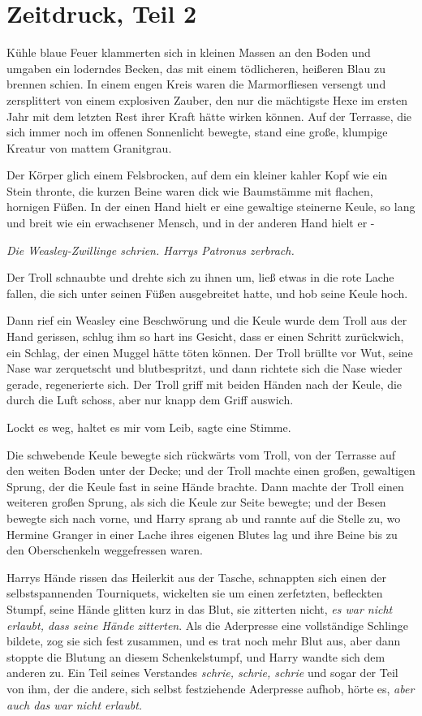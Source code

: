 \chapter{Zeitdruck, Teil 2}

Kühle blaue Feuer klammerten sich in kleinen Massen an den Boden und umgaben ein
loderndes Becken, das mit einem tödlicheren, heißeren Blau zu brennen schien. In
einem engen Kreis waren die Marmorfliesen versengt und zersplittert von einem
explosiven Zauber, den nur die mächtigste Hexe im ersten Jahr mit dem letzten
Rest ihrer Kraft hätte wirken können. Auf der Terrasse, die sich immer noch im
offenen Sonnenlicht bewegte, stand eine große, klumpige Kreatur von mattem
Granitgrau.

Der Körper glich einem Felsbrocken, auf dem ein kleiner kahler Kopf wie ein
Stein thronte, die kurzen Beine waren dick wie Baumstämme mit flachen, hornigen
Füßen. In der einen Hand hielt er eine gewaltige steinerne Keule, so lang und
breit wie ein erwachsener Mensch, und in der anderen Hand hielt er -

\emph{Die Weasley-Zwillinge schrien. Harrys Patronus zerbrach.}

Der Troll schnaubte und drehte sich zu ihnen um, ließ etwas in die rote Lache
fallen, die sich unter seinen Füßen ausgebreitet hatte, und hob seine Keule
hoch.

Dann rief ein Weasley eine Beschwörung und die Keule wurde dem Troll aus der
Hand gerissen, schlug ihm so hart ins Gesicht, dass er einen Schritt zurückwich,
ein Schlag, der einen Muggel hätte töten können. Der Troll brüllte vor Wut,
seine Nase war zerquetscht und blutbespritzt, und dann richtete sich die Nase
wieder gerade, regenerierte sich. Der Troll griff mit beiden Händen nach der
Keule, die durch die Luft schoss, aber nur knapp dem Griff auswich.

\glqq Lockt es weg, haltet es mir vom Leib\grqq{}, sagte eine Stimme.

Die schwebende Keule bewegte sich rückwärts vom Troll, von der Terrasse auf den
weiten Boden unter der Decke; und der Troll machte einen großen, gewaltigen
Sprung, der die Keule fast in seine Hände brachte. Dann machte der Troll einen
weiteren großen Sprung, als sich die Keule zur Seite bewegte; und der Besen
bewegte sich nach vorne, und Harry sprang ab und rannte auf die Stelle zu, wo
Hermine Granger in einer Lache ihres eigenen Blutes lag und ihre Beine bis zu
den Oberschenkeln weggefressen waren.

Harrys Hände rissen das Heilerkit aus der Tasche, schnappten sich einen der
selbstspannenden Tourniquets, wickelten sie um einen zerfetzten, befleckten
Stumpf, seine Hände glitten kurz in das Blut, sie zitterten nicht, \emph{es war
nicht erlaubt, dass seine Hände zitterten}. Als die Aderpresse eine vollständige
Schlinge bildete, zog sie sich fest zusammen, und es trat noch mehr Blut aus,
aber dann stoppte die Blutung an diesem Schenkelstumpf, und Harry wandte sich
dem anderen zu. Ein Teil seines Verstandes \emph{schrie, schrie, schrie} und
sogar der Teil von ihm, der die andere, sich selbst festziehende Aderpresse
aufhob, hörte es, \emph{aber auch das war nicht erlaubt.}

